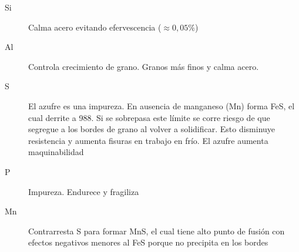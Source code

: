 \begin{description}
	\item[Si] Calma acero evitando efervescencia ($\approx0,05\%$)
	\item[Al] Controla crecimiento de grano. Granos más finos y calma acero.
	\item[S] El azufre es una impureza. En ausencia de manganeso (Mn) forma FeS, el cual derrite a 988\grad. Si se sobrepasa este límite se corre riesgo de que segregue a los bordes de grano al volver a solidificar. Esto disminuye resistencia y aumenta fisuras en trabajo en frío. El azufre aumenta maquinabilidad
	\item[P] Impureza. Endurece y fragiliza
	\item[Mn] Contrarresta S para formar MnS, el cual tiene alto punto de fusión con efectos negativos menores al FeS porque no precipita en los bordes    
\end{description}

